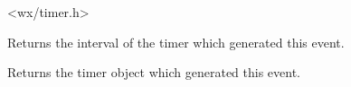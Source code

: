


<wx/timer.h>




\label{wxtimereventgetinterval}


Returns the interval of the timer which generated this event.


\label{wxtimereventgettimer}


Returns the timer object which generated this event.

